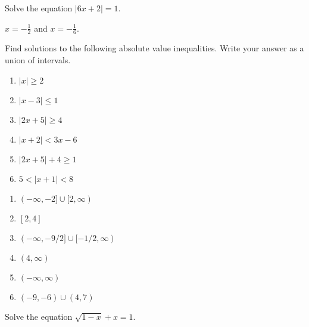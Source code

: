 \begin{enumialphparenastyle}
\begin{multicols}{2}
\begin{ex}
Solve the equation $|6x+2|=1$.
\begin{sol}
$x=-\frac{1}{2}$ and $x=-\frac{1}{6}$.
\end{sol}
\end{ex}

\begin{ex}
Find solutions to the following absolute value inequalities. Write your answer as a union of intervals.
\begin{multicols}{2}
\begin{enumerate}
	\item	$|x|\geq 2$
	\item	$|x-3|\leq 1$
	\item	$|2x+5|\geq 4$
	\item	$|x+2|<3x-6$
	\item	$|2x+5|+4\geq 1$
	\item	$5<|x+1|<8$
\end{enumerate}
\end{multicols}
\begin{sol}
\begin{multicols}{2}
\begin{enumerate}
	\item	$(-\infty,-2]\cup[2,\infty)$
	\item	$[2,4]$
	\item	$(-\infty,-9/2]\cup[-1/2,\infty)$
	\item	$(4,\infty)$
	\item	$(-\infty,\infty)$
	\item	$(-9,-6)\cup(4,7)$
\end{enumerate}
\end{multicols}
\end{sol}
\end{ex}

\begin{ex}
Solve the equation $\sqrt{1-x}+x=1$.
\end{ex}

\end{multicols}

\end{enumialphparenastyle}